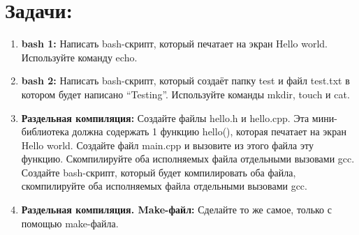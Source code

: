 \documentclass{article}
\begin{document}



\section*{Задачи:}
\begin{enumerate}
\item \textbf{bash 1:} Написать bash-скрипт, который печатает на экран Hello world. Используйте команду echo.
\item \textbf{bash 2:} Написать bash-скрипт, который создаёт папку test и файл test.txt в котором будет написано ``Testing''. Используйте команды mkdir, touch и cat.
\item \textbf{Раздельная компиляция:} Создайте файлы hello.h и hello.cpp. Эта мини-библиотека должна содержать 1 функцию hello(), которая печатает на экран Hello world. Создайте файл main.cpp и вызовите из этого файла эту функцию. Скомпилируйте оба исполняемых файла отдельными вызовами gcc.  Создайте bash-скрипт, который будет компилировать оба файла, скомпилируйте оба исполняемых файла отдельными вызовами gcc.
\item \textbf{Раздельная компиляция. Make-файл:} Сделайте то же самое, только с помощью make-файла.
\end{enumerate}
\end{document}
